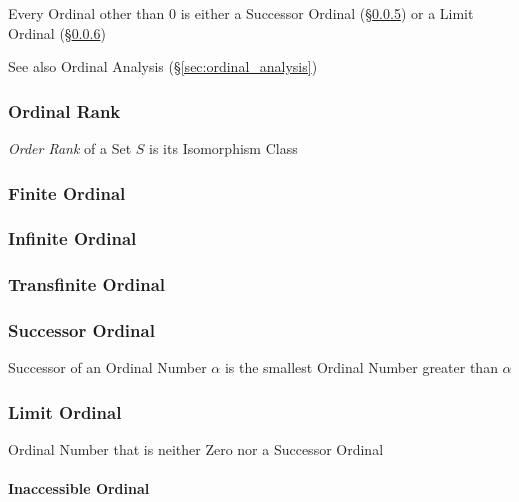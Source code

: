 Every Ordinal other than $0$ is either a Successor Ordinal
(\S\ref{sec:successor_ordinal}) or a Limit Ordinal
(\S\ref{sec:limit_ordinal})


\fist See also Ordinal Analysis (\S\ref{sec:ordinal_analysis})



\subsubsection{Ordinal Rank}\label{sec:ordinal_rank}

\emph{Order Rank} of a Set $S$ is its Isomorphism Class



\subsubsection{Finite Ordinal}\label{sec:finite_ordinal}

\subsubsection{Infinite Ordinal}\label{sec:infinite_ordinal}

\subsubsection{Transfinite Ordinal}\label{sec:transfinite_ordinal}

\subsubsection{Successor Ordinal}\label{sec:successor_ordinal}

Successor of an Ordinal Number $\alpha$ is the smallest Ordinal Number
greater than $\alpha$



\subsubsection{Limit Ordinal}\label{sec:limit_ordinal}

Ordinal Number that is neither Zero nor a Successor Ordinal



\paragraph{Inaccessible Ordinal}\label{sec:inaccessible_ordinal}\hfill



